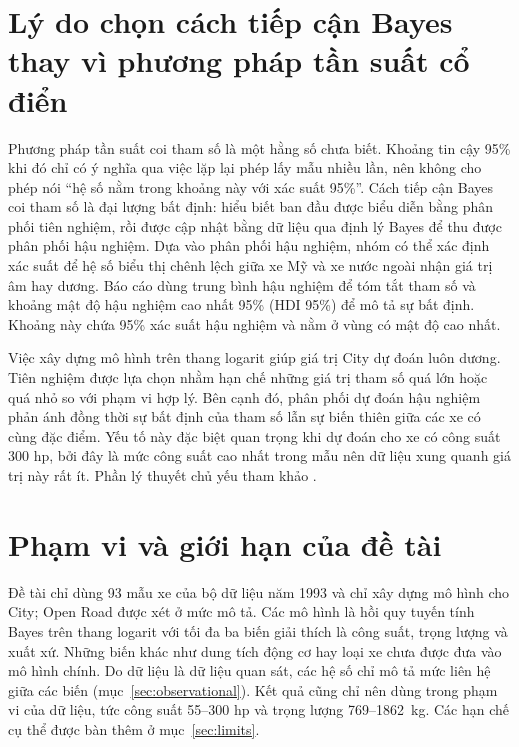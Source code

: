 \documentclass[12pt,a4paper]{report}
\begin{document}
\section{Lý do chọn cách tiếp cận Bayes thay vì phương pháp tần suất cổ điển}

Phương pháp tần suất coi tham số là một hằng số chưa biết. Khoảng tin cậy 95\%
khi đó chỉ có ý nghĩa qua việc lặp lại phép lấy mẫu nhiều lần, nên không cho
phép nói ``hệ số nằm trong khoảng này với xác suất 95\%''. Cách tiếp cận Bayes
coi tham số là đại lượng bất định: hiểu biết ban đầu được biểu diễn bằng phân
phối tiên nghiệm, rồi được cập nhật bằng dữ liệu qua định lý Bayes để thu được
phân phối hậu nghiệm. Dựa vào phân phối hậu nghiệm, nhóm có thể xác định xác
suất để hệ số biểu thị chênh lệch giữa xe Mỹ và xe nước ngoài nhận giá trị âm
hay dương. Báo cáo dùng trung bình hậu nghiệm để tóm tắt tham số và khoảng mật
độ hậu nghiệm cao nhất 95\% (HDI 95\%) để mô tả sự bất định. Khoảng này chứa
95\% xác suất hậu nghiệm và nằm ở vùng có mật độ cao nhất.

Việc xây dựng mô hình trên thang logarit giúp giá trị City dự đoán luôn dương.
Tiên nghiệm được lựa chọn nhằm hạn chế những giá trị tham số quá lớn hoặc quá
nhỏ so với phạm vi hợp lý. Bên cạnh đó, phân phối dự đoán hậu nghiệm phản ánh
đồng thời sự bất định của tham số lẫn sự biến thiên giữa các xe có cùng đặc
điểm. Yếu tố này đặc biệt quan trọng khi dự đoán cho xe có công suất 300 hp,
bởi đây là mức công suất cao nhất trong mẫu nên dữ liệu xung quanh giá trị này
rất ít. Phần lý thuyết chủ yếu tham khảo
\cite{gelman2013bda, mcelreath2020rethinking}.

\section{Phạm vi và giới hạn của đề tài}

Đề tài chỉ dùng 93 mẫu xe của bộ dữ liệu năm 1993 và chỉ xây dựng mô hình cho
City; Open Road được xét ở mức mô tả. Các mô hình là hồi quy tuyến tính Bayes
trên thang logarit với tối đa ba biến giải thích là công suất, trọng lượng và
xuất xứ. Những biến khác như dung tích động cơ hay loại xe chưa được đưa vào mô
hình chính. Do dữ liệu là dữ liệu quan sát, các hệ số chỉ mô tả mức liên hệ
giữa các biến (mục~\ref{sec:observational}). Kết quả cũng chỉ
nên dùng trong phạm vi của dữ liệu, tức công suất 55--300 hp và trọng lượng
769--\SI{1862}{kg}. Các hạn chế cụ thể được bàn thêm ở mục~\ref{sec:limits}.

\end{document}
